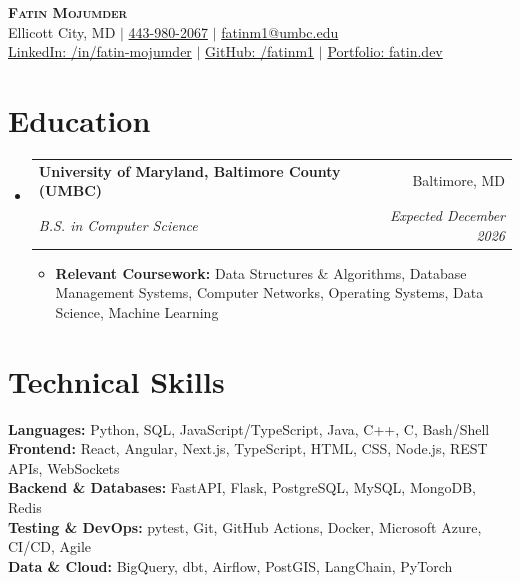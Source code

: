 \documentclass[letterpaper,10pt]{article}
\makeatletter
\newcommand{\resumeItem}[1]{
  \item\small{
    {#1 \vspace{-2pt}}
  }
}
\newcommand{\resumeSubheading}[4]{
  \vspace{-2pt}\item
    \begin{tabular*}{0.97\textwidth}[t]{l@{\extracolsep{\fill}}r}
      \textbf{#1} & #2 \\
      \textit{\small#3} & \textit{\small #4} \\
    \end{tabular*}\vspace{-7pt}
}
\newcommand{\resumeSubHeadingListStart}{\begin{itemize}[leftmargin=0.15in, label={}]}
\newcommand{\resumeSubHeadingListEnd}{\end{itemize}}
\newcommand{\resumeItemListStart}{\begin{itemize}}
\newcommand{\resumeItemListEnd}{\end{itemize}\vspace{-5pt}}
\makeatother
\begin{document}
\begin{center}
    \textbf{\Huge \scshape Fatin Mojumder} \\ \vspace{4pt}
    \small
    Ellicott City, MD $|$
    \href{tel:4439802067}{443-980-2067} $|$
    \href{mailto:fatinm1@umbc.edu}{fatinm1@umbc.edu} \\ \vspace{2pt}
    \href{https://linkedin.com/in/fatin-mojumder}{LinkedIn: /in/fatin-mojumder} $|$
    \href{https://github.com/fatinm1}{GitHub: /fatinm1} $|$
    \href{https://fatin.dev}{Portfolio: fatin.dev}
\end{center}

\section{Education}
  \resumeSubHeadingListStart
    \resumeSubheading
      {University of Maryland, Baltimore County (UMBC)}{Baltimore, MD}
      {B.S. in Computer Science}{Expected December 2026}
      \resumeItemListStart
        \resumeItem{\textbf{Relevant Coursework:} Data Structures \& Algorithms, Database Management Systems, Computer Networks, Operating Systems, Data Science, Machine Learning}
      \resumeItemListEnd
  \resumeSubHeadingListEnd

\section{Technical Skills}
 \begin{itemize}[leftmargin=0.15in, label={}]
    \small{\item{
     \textbf{Languages:}{ Python, SQL, JavaScript/TypeScript, Java, C++, C, Bash/Shell} \\
     \textbf{Frontend:}{ React, Angular, Next.js, TypeScript, HTML, CSS, Node.js, REST APIs, WebSockets} \\
     \textbf{Backend \& Databases:}{ FastAPI, Flask, PostgreSQL, MySQL, MongoDB, Redis} \\
     \textbf{Testing \& DevOps:}{ pytest, Git, GitHub Actions, Docker, Microsoft Azure, CI/CD, Agile} \\
     \textbf{Data \& Cloud:}{ BigQuery, dbt, Airflow, PostGIS, LangChain, PyTorch}
    }}
 \end{itemize}
\end{document}
